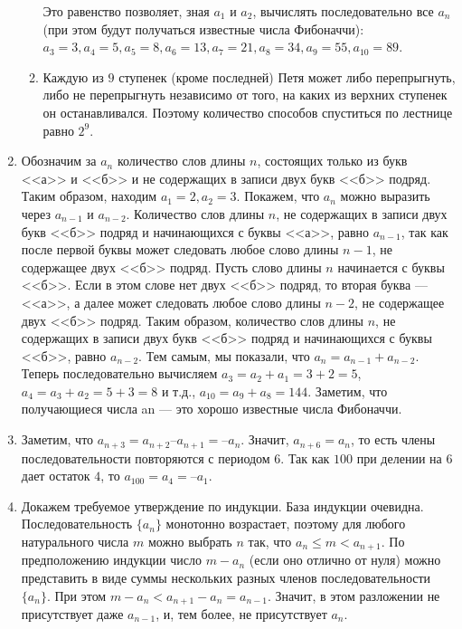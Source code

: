 \documentclass[14pt,openany]{book}
\begin{document}
\begin{enumerate}
\begin{enumerate}
   Это равенство позволяет, зная $a_1$ и $a_2$, вычислять последовательно все $a_n$ (при этом будут получаться известные числа Фибоначчи):
$a_3 = 3,  a_4 = 5,  a_5 = 8,  a_6 = 13,  a_7 = 21,  a_8 = 34,  a_9 = 55,  a_{10} = 89$.

   \item Каждую из $9$ ступенек (кроме последней) Петя может либо перепрыгнуть, либо не перепрыгнуть независимо от того, на каких из верхних ступенек он останавливался. Поэтому количество способов спуститься по лестнице равно $2^9$.

 \end{enumerate}

\item Обозначим за $a_n$ количество слов длины $n$, состоящих только из букв <<а>> и <<б>> и не содержащих в записи двух букв <<б>> подряд. Таким образом, находим $a_1=2, a_2=3$. Покажем, что $a_n$ можно выразить через $a_{n-1}$ и $a_{n-2}$. Количество слов длины $n$, не содержащих в записи двух букв <<б>> подряд и начинающихся с буквы <<а>>, равно $a_{n-1}$, так как после первой буквы может следовать любое слово длины $n-1$, не содержащее двух <<б>> подряд. Пусть слово длины $n$ начинается с буквы <<б>>. Если в этом слове нет двух <<б>> подряд, то вторая буква --- <<а>>, а далее может следовать любое слово длины $n-2$, не содержащее двух <<б>> подряд. Таким образом, количество слов длины $n$, не содержащих в записи двух букв <<б>> подряд и начинающихся с буквы <<б>>, равно $a_{n-2}$. Тем самым, мы показали, что $a_n=a_{n-1}+a_{n-2}$. Теперь последовательно вычисляем $a_3=a_2+a_1=3+2=5$, $a_4=a_3+a_2=5+3=8$ и т.д., $a_{10}=a_9+a_8=144$. Заметим, что получающиеся числа an --- это хорошо известные числа Фибоначчи. 

\item Заметим, что  $a_{n+3} = a_{n+2} – a_{n+1} = –a_n$.  Значит,  $a_{n+6} = a_n$,  то есть члены последовательности повторяются с периодом $6$. Так как $100$ при делении на $6$ дает остаток $4$, то  $a_{100} = a_4 = –a_1$.

\item Докажем требуемое утверждение по индукции. База индукции очевидна. Последовательность $\{a_n\}$ монотонно возрастает, поэтому для любого натурального числа $m$ можно выбрать $n$ так, что 
$a_n \le m < a_{n+1}$. По предположению индукции число $m - a_n$ (если оно отлично от нуля) можно представить в виде суммы нескольких разных членов последовательности $\{a_n\}$. При этом 
$m - a_n < a_{n + 1} - a_n = a_{n - 1}$. Значит, в этом разложении не присутствует даже 
$a_{n - 1}$, и, тем более, не присутствует $a_n$. 


\end{enumerate}
\end{document}
